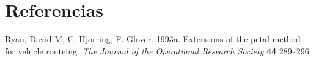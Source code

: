 \section{Referencias}
Ryan, David M, C. Hjorring, F. Glover. 1993a. Extensions of the petal method for vehicle routeing. \textit{The Journal of the Operational Research Society} \textbf{44} 289–296.